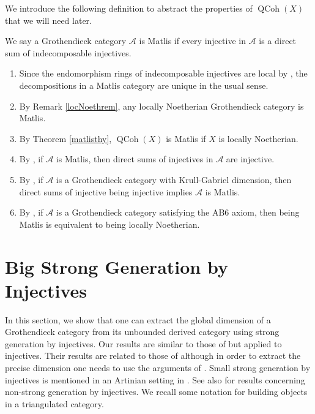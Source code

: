 \documentclass[12pt,oneside]{amsart}
\DeclareMathOperator{\QCoh}{QCoh}
\begin{document}
We introduce the following definition to abstract the properties of $\QCoh(X)$ that we will need later.

\begin{defn} \label{Matliscat}
We say a Grothendieck category $\mathcal{A}$ is Matlis if every injective in $\mathcal{A}$ is a direct sum of indecomposable injectives.
\end{defn}

\begin{remark} \label{matlisfacts}
\begin{enumerate}
\item Since the endomorphism rings of indecomposable injectives are local by \cite[II.5 Proposition 11]{Gab62}, the decompositions in a Matlis category are unique in the usual sense.

\item By Remark \ref{locNoethrem}, any locally Noetherian Grothendieck category is Matlis.

\item By Theorem \ref{matlisthy}, $\QCoh(X)$ is Matlis if $X$ is locally Noetherian.

\item By \cite[Theorem 2]{Ste68}, if $\mathcal{A}$ is Matlis, then direct sums of injectives in $\mathcal{A}$ are injective.

\item By \cite[IV.1 Theorem 1]{Gab62}, if $\mathcal{A}$ is a Grothendieck category with  Krull-Gabriel dimension, then direct sums of injective being injective implies $\mathcal{A}$ is Matlis. 

\item By \cite[Theorem 3]{Ste68}, if $\mathcal{A}$ is a Grothendieck category satisfying the AB6 axiom, then being Matlis is equivalent to being locally Noetherian. 

\end{enumerate}
\end{remark}





\section{Big Strong Generation by Injectives}
\label{bigstronggensec}

In this section, we show that one can extract the global dimension of a Grothendieck category from its unbounded derived category using strong generation by injectives. Our results are similar to those of \cite{KK05} but applied to injectives. Their results are related to those of \cite{Rou08} although in order to extract the precise dimension one needs to use the arguments of \cite{KK05}. Small strong generation by injectives is mentioned in an Artinian setting in \cite[Example 6.1]{BIKP24}. See also \cite{Ric19} for results concerning non-strong generation by injectives. We recall some notation for building objects in a triangulated category.
\end{document}
